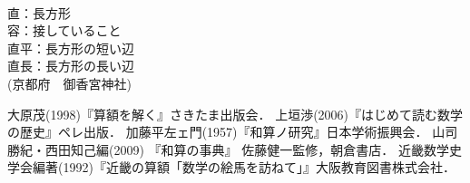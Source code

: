 \documentclass[./main]{subfiles}
\begin{document}
\begin{flushleft}
[用語] \\
直：長方形 \\
容：接していること \\
直平：長方形の短い辺 \\
直長：長方形の長い辺 \\
(京都府　御香宮神社)
\end{flushleft}

\begin{thebibliography}{9}
 大原茂(1998)『算額を解く』さきたま出版会．
 上垣渉(2006)『はじめて読む数学の歴史』ペレ出版．
 加藤平左ェ門(1957)『和算ノ研究』日本学術振興会．
 山司勝紀・西田知己編(2009) 『和算の事典』 佐藤健一監修，朝倉書店．
 近畿数学史学会編著(1992)『近畿の算額「数学の絵馬を訪ねて」』大阪教育図書株式会社．
\end{thebibliography}
\end{document}

